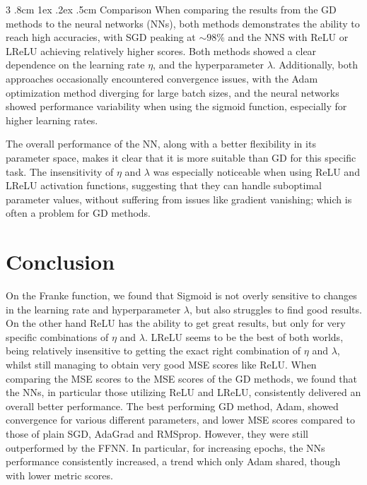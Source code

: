 \documentclass[%
reprint,s
amsmath,amssymb,
aps,
]{revtex4-2}
\makeatletter
\renewcommand{\subsubsection}{%
	\@startsection
	{subsubsection}%
	{3}%
	{\z@}%
	{.8cm \@plus1ex \@minus .2ex}%
	{.5cm}%
	{\normalfont\small\centering}%
}
\makeatother
\begin{document}
\subsubsection{Comparison}
When comparing the results from the GD methods to the neural networks (NNs), both methods demonstrates the ability to reach high accuracies, with SGD peaking at \(\sim 98\%\) and the NNS with ReLU or LReLU achieving relatively higher scores. Both methods showed a clear dependence on the learning rate \(\eta\), and the hyperparameter \(\lambda\). Additionally, both approaches occasionally encountered convergence issues, with the Adam optimization method diverging for large batch sizes, and the neural networks showed performance variability when using the sigmoid function, especially for higher learning rates. 

The overall performance of the NN, along with a better flexibility in its parameter space, makes it clear that it is more suitable than GD for this specific task. The insensitivity of $\eta$ and $\lambda$ was especially noticeable when using ReLU and LReLU activation functions, suggesting that they can handle suboptimal parameter values, without suffering from issues like gradient vanishing; which is often a problem for GD methods.

\section{Conclusion}
On the Franke function, we found that Sigmoid is not overly sensitive to changes in the learning rate and hyperparameter $\lambda$, but also struggles to find good results. On the other hand ReLU has the ability to get great results, but only for very specific combinations of $\eta$ and $\lambda$. LReLU seems to be the best of both worlds, being relatively insensitive to getting the exact right combination of $\eta$ and $\lambda$, whilst still managing to obtain very good MSE scores like ReLU. When comparing the MSE scores to the MSE scores of the GD methods, we found that the NNs, in particular those utilizing ReLU and LReLU, consistently delivered an overall better performance. The best performing GD method, Adam, showed convergence for various different parameters, and lower MSE scores compared to those of plain SGD, AdaGrad and RMSprop. However, they were still outperformed by the FFNN. In particular, for increasing epochs, the NNs performance consistently increased, a trend which only Adam shared, though with lower metric scores.
\end{document}
